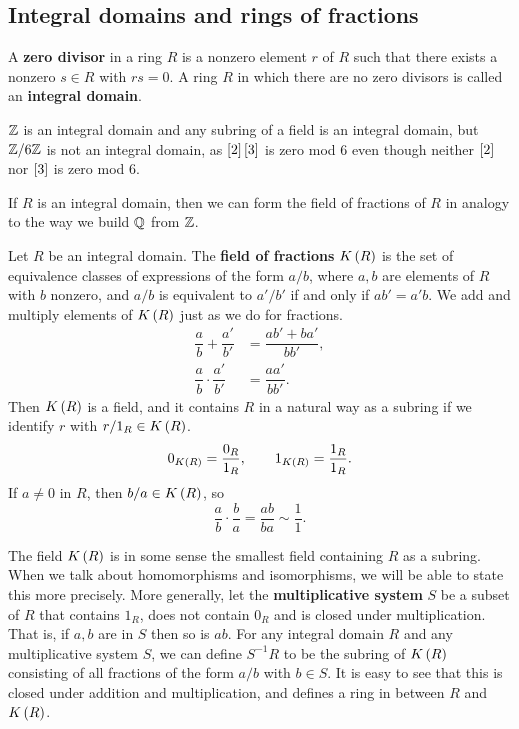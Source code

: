 
\subsection{Integral domains and rings of fractions}

\begin{definition}
A \textbf{zero divisor} in a ring $ R $ is a nonzero element $ r $ of $ R $ such that there exists a nonzero $ s \in R $ with $ rs = 0 $. A ring $ R $ in which there are no zero divisors is called an \textbf{integral domain}.
\end{definition}

\begin{example*}
$ \Z $ is an integral domain and any subring of a field is an integral domain, but $ \Z / 6\Z $ is not an integral domain, as $ \sb{2}\sb{3} $ is zero mod $ 6 $ even though neither $ \sb{2} $ nor $ \sb{3} $ is zero mod $ 6 $.
\end{example*}

If $ R $ is an integral domain, then we can form the field of fractions of $ R $ in analogy to the way we build $ \Q $ from $ \Z $.

\begin{definition}
Let $ R $ be an integral domain. The \textbf{field of fractions} $ K\rb{R} $ is the set of equivalence classes of expressions of the form $ a / b $, where $ a, b $ are elements of $ R $ with $ b $ nonzero, and $ a / b $ is equivalent to $ a' / b' $ if and only if $ ab' = a'b $. We add and multiply elements of $ K\rb{R} $ just as we do for fractions.
\begin{align*}
\dfrac{a}{b} + \dfrac{a'}{b'} & = \dfrac{ab' + ba'}{bb'}, \\
\dfrac{a}{b} \cdot \dfrac{a'}{b'} & = \dfrac{aa'}{bb'}.
\end{align*}
Then $ K\rb{R} $ is a field, and it contains $ R $ in a natural way as a subring if we identify $ r $ with $ r / 1_R \in K\rb{R} $.
$$ 0_{K\rb{R}} = \dfrac{0_R}{1_R}, \qquad 1_{K\rb{R}} = \dfrac{1_R}{1_R}. $$
If $ a \ne 0 $ in $ R $, then $ b / a \in K\rb{R} $, so
$$ \dfrac{a}{b} \cdot \dfrac{b}{a} = \dfrac{ab}{ba} \sim \dfrac{1}{1}. $$
\end{definition}

The field $ K\rb{R} $ is in some sense the smallest field containing $ R $ as a subring. When we talk about homomorphisms and isomorphisms, we will be able to state this more precisely. More generally, let the \textbf{multiplicative system} $ S $ be a subset of $ R $ that contains $ 1_R $, does not contain $ 0_R $ and is closed under multiplication. That is, if $ a, b $ are in $ S $ then so is $ ab $. For any integral domain $ R $ and any multiplicative system $ S $, we can define $ S^{-1}R $ to be the subring of $ K\rb{R} $ consisting of all fractions of the form $ a / b $ with $ b \in S $. It is easy to see that this is closed under addition and multiplication, and defines a ring in between $ R $ and $ K\rb{R} $.

